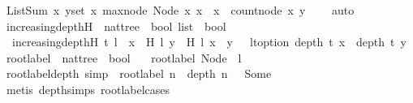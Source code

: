 \begin{isabellebody}
\ ListSum{\isacharunderscore}{}\ {\isacartoucheopen}{\isasymforall}x{\isachardot}\ {\isasymforall}y{\isasymin}set\ x{}{\isachardot}\ max{\isacharunderscore}node\ {\isacharparenleft}Node\ x{}\ x{}{\isacharparenright}\ {\isacharless}\ x\ {\isasymlongrightarrow}\ count{\isacharunderscore}node\ x\ y\ {\isacharequal}\ {}{\isacartoucheclose}\ \isamarkupfalse%
\ auto\ \isanewline
\ \ \isamarkupfalse%
%
\endisatagproof
{\isafoldproof}%
%
\isadelimproof
\isanewline
%
\endisadelimproof
\ \ \isanewline
{}\isamarkupfalse%
\ increasing{\isacharunderscore}depth{\isacharunderscore}H\ {\isacharcolon}{\isacharcolon}\ {\isachardoublequoteopen}nattree\ {\isasymRightarrow}\ bool\ list\ {\isasymRightarrow}\ bool{\isachardoublequoteclose}\ \ \isanewline
\ \ {\isachardoublequoteopen}increasing{\isacharunderscore}depth{\isacharunderscore}H\ t\ l\ {\isacharequal}\ {\isacharparenleft}{\isasymforall}x\ {\isasymin}\ H\ l{\isachardot}\ {\isasymforall}y\ {\isasymin}\ H\ l{\isachardot}\ x\ {\isacharless}\ y\ {\isasymlongrightarrow}\ \ lt{\isacharunderscore}option\ {\isacharparenleft}depth\ t\ x{\isacharparenright}\ \ {\isacharparenleft}depth\ t\ y{\isacharparenright}{\isacharparenright}{\isachardoublequoteclose}\isanewline
\isanewline
{}\isamarkupfalse%
\ root{\isacharunderscore}label{\isacharunderscore}{}\ {\isacharcolon}{\isacharcolon}\ {\isachardoublequoteopen}nattree\ {\isasymRightarrow}\ bool{\isachardoublequoteclose}\ \isanewline
\ \ {\isachardoublequoteopen}root{\isacharunderscore}label{\isacharunderscore}{}\ {\isacharparenleft}Node\ {}\ l{\isacharparenright}{\isachardoublequoteclose}\isanewline
\ \ \isanewline
{}\isamarkupfalse%
\ root{\isacharunderscore}label{\isacharunderscore}{}{\isacharunderscore}depth{\isacharunderscore}{}\ {\isacharbrackleft}simp{\isacharbrackright}\ {\isacharcolon}\ {\isachardoublequoteopen}root{\isacharunderscore}label{\isacharunderscore}{}\ n\ {\isasymlongrightarrow}\ depth\ n\ {}\ {\isacharequal}\ Some\ {}{\isachardoublequoteclose}\isanewline
%
\isadelimproof
\ \ %
\endisadelimproof
%
\isatagproof
{}\isamarkupfalse%
\ {\isacharparenleft}metis\ depth{\isachardot}simps{\isacharparenleft}{}{\isacharparenright}\ root{\isacharunderscore}label{\isacharunderscore}{}{\isachardot}cases{\isacharparenright}%
\endisatagproof
{\isafoldproof}%
%
\isadelimproof

\end{isabellebody}
